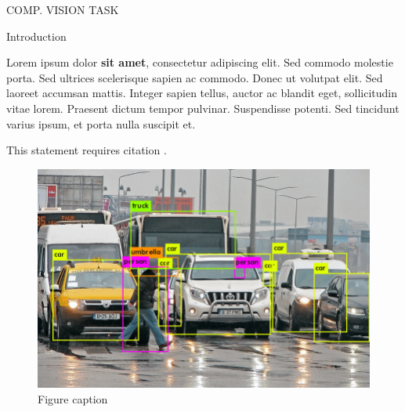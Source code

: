 \documentclass[final]{beamer}
\newlength{\onecolwid}
\begin{document}
\begin{frame}[t]
\begin{columns}[t]
\begin{column}{\onecolwid}
\begin{alertblock}{COMP. VISION TASK}
\end{alertblock}


\begin{block}{Introduction}

Lorem ipsum dolor \textbf{sit amet}, consectetur adipiscing elit. Sed commodo molestie porta. Sed ultrices scelerisque sapien ac commodo. Donec ut volutpat elit. Sed laoreet accumsan mattis. Integer sapien tellus, auctor ac blandit eget, sollicitudin vitae lorem. Praesent dictum tempor pulvinar. Suspendisse potenti. Sed tincidunt varius ipsum, et porta nulla suscipit et. 

This statement requires citation \cite{Smith:2012qr}.

\end{block}


\begin{figure}
\includegraphics[width=0.85\linewidth]{object-detection-dense-scene.png}
\caption{Figure caption}
\end{figure}


\end{column} %



\end{columns}
\end{frame}
\end{document}
